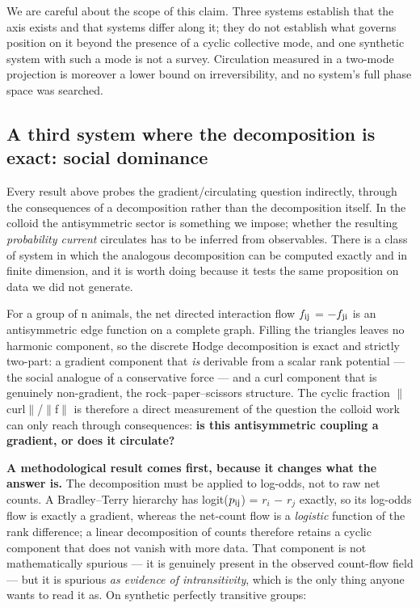 \documentclass[aps,pre,preprint,superscriptaddress,nofootinbib,longbibliography]{revtex4-2}
\begin{document}
We are careful about the scope of this claim. Three systems establish that the axis exists and that systems differ along it; they do not establish what governs position on it beyond the presence of a cyclic collective mode, and one synthetic system with such a mode is not a survey. Circulation measured in a two-mode projection is moreover a lower bound on irreversibility, and no system's full phase space was searched.

\subsection{A third system where the decomposition is exact: social dominance}

Every result above probes the gradient/circulating question indirectly, through the consequences of a decomposition rather than the decomposition itself. In the colloid the antisymmetric sector is something we impose; whether the resulting \emph{probability current} circulates has to be inferred from observables. There is a class of system in which the analogous decomposition can be computed exactly and in finite dimension, and it is worth doing because it tests the same proposition on data we did not generate.

For a group of n animals, the net directed interaction flow $f_{\rm ij}$ = $-$$f_{\rm ji}$ is an antisymmetric edge function on a complete graph. Filling the triangles leaves no harmonic component, so the discrete Hodge decomposition \cite{r28} is exact and strictly two-part: a gradient component that \emph{is} derivable from a scalar rank potential --- the social analogue of a conservative force --- and a curl component that is genuinely non-gradient, the rock--paper--scissors structure. The cyclic fraction $\|$curl$\|$/$\|$f$\|$ is therefore a direct measurement of the question the colloid work can only reach through consequences: \textbf{is this antisymmetric coupling a gradient, or does it circulate?}

\textbf{A methodological result comes first, because it changes what the answer is.} The decomposition must be applied to log-odds, not to raw net counts. A Bradley--Terry hierarchy has logit($p_{\rm ij}$) = $r_{i}$ $-$ $r_{j}$ exactly, so its log-odds flow is exactly a gradient, whereas the net-count flow is a \emph{logistic} function of the rank difference; a linear decomposition of counts therefore retains a cyclic component that does not vanish with more data. That component is not mathematically spurious --- it is genuinely present in the observed count-flow field --- but it is spurious \emph{as evidence of intransitivity}, which is the only thing anyone wants to read it as. On synthetic perfectly transitive groups:
\end{document}
